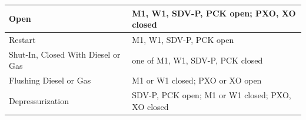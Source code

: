\begin{tabular}{@{}l>{\raggedright\arraybackslash}p{44mm}@{}}
  \toprule
  Open & M1, W1, SDV-P, PCK open; PXO, XO closed \\
  \midrule
  Restart & M1, W1, SDV-P, PCK open \\
  \midrule
  Shut-In, Closed With Diesel or Gas & one of M1, W1, SDV-P, PCK closed \\
  \midrule
  Flushing Diesel or Gas & M1 or W1 closed; PXO or XO open \\
  \midrule
  Depressurization & SDV-P, PCK open; M1 or W1 closed; PXO, XO closed \\
\end{tabular}
